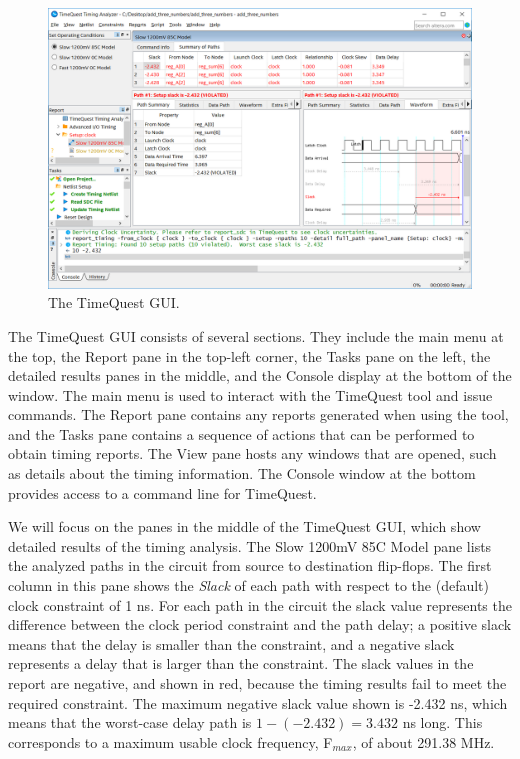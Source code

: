\documentclass[11pt, twoside, pdftex]{article}
\begin{document}
\begin{figure}[H]
\begin{center}
\includegraphics[scale=0.5]{figures/SB3.png}
\end{center}
\caption{The TimeQuest GUI.}
\label{fig:SB3}
\end{figure}

The TimeQuest GUI consists of several sections. They include the main menu at the top, the 
Report pane in the top-left corner, the Tasks pane on the left, the detailed results panes
in the middle, and the Console display at the bottom of the window. The main menu is used 
to interact with the TimeQuest tool and issue commands. The Report pane contains any 
reports generated when 
using the tool, and the Tasks pane contains a sequence of actions that can be performed to
obtain timing reports. The View pane hosts any windows that are opened, such as details
about the timing information.  The Console window at the bottom provides access to a command 
line for TimeQuest.

We will focus on the panes in the middle of the TimeQuest GUI, which show detailed
results of the timing analysis. The {\sf Slow 1200mV 85C Model} pane lists the analyzed paths in the 
circuit from source to destination flip-flops. The first column in this pane shows the
{\it Slack} of each path with respect to the (default) clock constraint of 1 ns.  For each
path in the circuit the slack value represents the difference between the clock period 
constraint and the path delay; a positive slack means that the delay is smaller than the 
constraint, and a negative slack represents a delay that is larger than the constraint. 
The slack values in the report are negative, and shown in red, because the timing results 
fail to meet the required constraint.  The maximum negative slack value shown is -2.432 ns, 
which means that the worst-case delay path is $1 - (-2.432) = 3.432$ ns long. This corresponds 
to a maximum usable clock frequency, F$_{max}$, of about 291.38 MHz.
\end{document}
